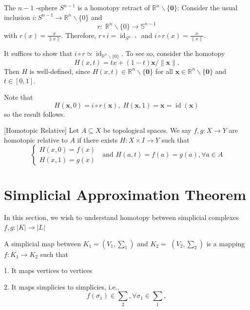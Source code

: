 \begin{example} The \(n - 1\) -sphere \({S}^{n - 1}\) is a homotopy retract of \({\mathbb{R}}^{n} \smallsetminus  \{ \mathbf{0}\}\): Consider the usual inclusion \(i : {S}^{n - 1} \rightarrow  {\mathbb{R}}^{n} \smallsetminus  \{ 0\}\) and
\[
r : \;{\mathbb{R}}^{n} \smallsetminus  \{ 0\}  \rightarrow  {\mathbb{S}}^{n - 1}
\]
with $r(x) = \frac{x}{\parallel x\parallel }$. Therefore, \(r \circ  i = {\operatorname{id}}_{{S}^{n - 1}}\) and \(i \circ  r\left( x\right)  = \frac{x}{\parallel x\parallel }\).

It suffices to show that \(i \circ  r \simeq  {\operatorname{id}}_{{\mathbb{R}}^{n}\smallsetminus \{ 0\} }\). To see so, consider the homotopy 
\[H\left( {x, t}\right)  = {tx} + (1 -t)\mathbf{x}/\parallel \mathbf{x}\parallel.\] 
Then $H$ is well-defined, since \(H\left( {x, t}\right)  \in  {\mathbb{R}}^{n} \smallsetminus  \{ \mathbf{0}\}\) for all \(\mathbf{x} \in  {\mathbb{R}}^{n} \smallsetminus  \{ \mathbf{0}\}\) and \(t \in  \left\lbrack  {0, 1}\right\rbrack\).

Note that 
\[
H\left( {\mathbf{x}, 0}\right)  = i \circ  r\left( \mathbf{x}\right), \;H\left( {\mathbf{x}, 1}\right)  = \mathbf{x} = \operatorname{id}\left( \mathbf{x}\right)
\]
so the result follows.
\end{example}

\begin{definition} \label{def:relative_homotopy} [Homotopic Relative] Let \(A \subseteq  X\) be topological spaces. We say \(f, g : X \rightarrow  Y\) are homotopic relative to \(A\) if there exists \(H : X \times  I \rightarrow  Y\) such that
\[
\left\{  {\begin{array}{l} H\left( {x, 0}\right)  = f\left( x\right) \\  H\left( {x, 1}\right)  = g\left( x\right)  \end{array}\;\text{ and }H\left( {a, t}\right)  = f\left( a\right)  = g\left( a\right), \forall a \in  A}\right.
\]
\end{definition}

\section{Simplicial Approximation Theorem}
In this section, we wish to understand homotopy between simplicial complexes \(f, g : \left| K\right|  \rightarrow  \left| L\right|\)

\begin{definition}  A simplicial map between \({K}_{1} = \left( {{V}_{1}, {\sum }_{1}}\right)\) and \({K}_{2} =\)  \(\left( {{V}_{2}, {\sum }_{2}}\right)\) is a mapping \(f : {K}_{1} \rightarrow  {K}_{2}\) such that

1. It maps vertices to vertices

2. It maps simplicies to simplicies, i.e., 
\[
f\left( {\sigma }_{1}\right)  \in  {\sum }_{2}, \forall {\sigma }_{1} \in  {\sum }_{1}, 
\]
\end{definition}

